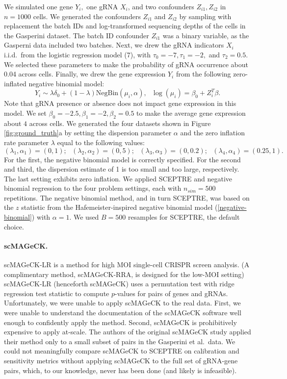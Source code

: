 \documentclass{article}
\begin{document}
We simulated one gene $Y_i,$ one gRNA $X_{i}$, and two confounders $Z_{i1}, Z_{i2}$ in $n = 1000$ cells. We generated the confounders $Z_{i1}$ and $Z_{i2}$ by sampling with replacement the batch IDs and log-transformed sequencing depths of the cells in the Gasperini dataset. The batch ID confounder $Z_{i1}$ was a binary variable, as the Gasperni data included two batches. Next, we drew the gRNA indicators $X_{i}$ i.i.d.\ from the logistic regression model (7), with $\tau_0 = -7, \tau_1 = -2,$ and $\tau_2 = 0.5$. We selected these parameters to make the probability of gRNA occurrence about 0.04 across cells. Finally, we drew the gene expression $Y_i$ from the following zero-inflated negative binomial model:
$$ Y_i \sim \lambda \delta_0 + (1 - \lambda) \textrm{NegBin}(\mu_i, \alpha), \textrm{ } \log(\mu_i) = \beta_0 + Z_i^T \beta.$$ Note that gRNA presence or absence does not impact gene expression in this model. 
We set $\beta_0 = -2.5, \beta_1 = -2, \beta_2 = 0.5$ to make the average gene expression about $4$ across cells. We generated the four datasets shown in Figure \ref{fig:ground_truth}a by setting the dispersion parameter $\alpha$ and the zero inflation rate parameter $\lambda$ equal to the following values:
$$ (\lambda_1, \alpha_1) = (0,1) ; \textrm{    } (\lambda_2, \alpha_2) = (0, 5); \textrm{     } (\lambda_3, \alpha_3) = (0, 0.2); \textrm{     } (\lambda_4, \alpha_4) = (0.25, 1).$$ For the first, the negative binomial model is correctly specified. For the second and third, the dispersion estimate of 1 is too small and too large, respectively. The last setting exhibits zero inflation. We applied SCEPTRE and negative binomial regression to the four problem settings, each with $n_{sim} = 500$ repetitions. The negative binomial method, and in turn SCEPTRE, was based on the $z$ statistic from the Hafemeister-inspired negative binomial model (\ref{negative-binomial}) with $\alpha = 1$. We used $B = 500$ resamples for SCEPTRE, the default choice.

\paragraph{scMAGeCK.} scMAGeCK-LR\cite{Yang2020} is a method for high MOI single-cell CRISPR screen analysis. (A complimentary method, scMAGeCK-RRA, is designed for the low-MOI setting) scMAGeCK-LR (henceforth scMAGeCK) uses a permutation test with ridge regression test statistic to compute $p$-values for pairs of genes and gRNAs. Unfortunately, we were unable to apply scMAGeCK to the real data. First, we were unable to understand the documentation of the scMAGeCK software well enough to confidently apply the method. Second, scMAGeCK is prohibitively expensive to apply at-scale. The authors of the original scMAGeCK study applied their method only to a small subset of pairs in the Gasperini et al.\ data. We could not meaningfully compare scMAGeCK to SCEPTRE on calibration and sensitivity metrics without applying scMAGeCK to the full set of gRNA-gene pairs, which, to our knowledge, never has been done (and likely is infeasible).
\end{document}
